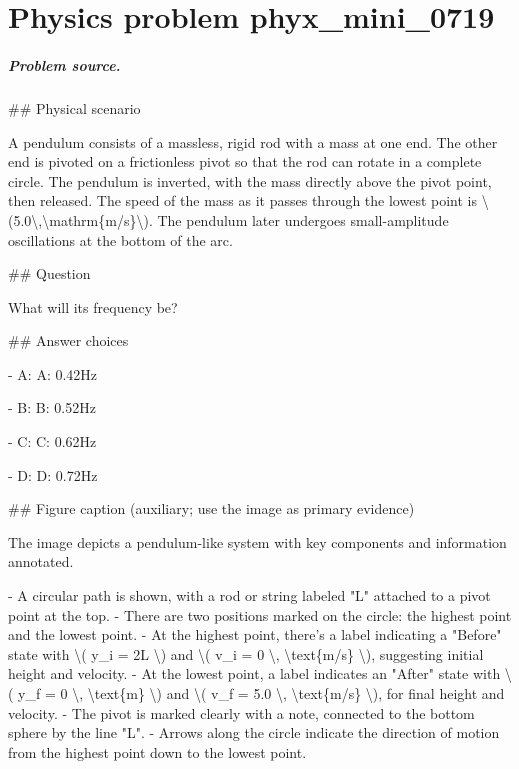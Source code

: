 
\chapter{Physics problem phyx\_mini\_0719}
\label{ch:PhyXMiniProblems_problem_phyx_mini_0719}

\paragraph{Problem source.}
\#\# Physical scenario

A pendulum consists of a massless, rigid rod with a mass at one end. The other end is pivoted on a frictionless pivot so that the rod can rotate in a complete circle. The pendulum is inverted, with the mass directly above the pivot point, then released. The speed of the mass as it passes through the lowest point is \textbackslash{}(5.0\textbackslash{},\textbackslash{}mathrm\{m/s\}\textbackslash{}). The pendulum later undergoes small-amplitude oscillations at the bottom of the arc.

\#\# Question

What will its frequency be?

\#\# Answer choices

- A: A: 0.42Hz

- B: B: 0.52Hz

- C: C: 0.62Hz

- D: D: 0.72Hz

\#\# Figure caption (auxiliary; use the image as primary evidence)

The image depicts a pendulum-like system with key components and information annotated. 

- A circular path is shown, with a rod or string labeled "L" attached to a pivot point at the top.
- There are two positions marked on the circle: the highest point and the lowest point.
- At the highest point, there's a label indicating a "Before" state with \textbackslash{}( y\_i = 2L \textbackslash{}) and \textbackslash{}( v\_i = 0 \textbackslash{}, \textbackslash{}text\{m/s\} \textbackslash{}), suggesting initial height and velocity.
- At the lowest point, a label indicates an "After" state with \textbackslash{}( y\_f = 0 \textbackslash{}, \textbackslash{}text\{m\} \textbackslash{}) and \textbackslash{}( v\_f = 5.0 \textbackslash{}, \textbackslash{}text\{m/s\} \textbackslash{}), for final height and velocity.
- The pivot is marked clearly with a note, connected to the bottom sphere by the line "L".
- Arrows along the circle indicate the direction of motion from the highest point down to the lowest point.

